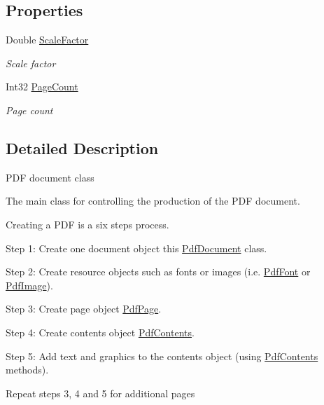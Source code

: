 \subsection*{Properties}
\begin{DoxyCompactItemize}
\item 
Double \hyperlink{class_pdf_file_writer_1_1_pdf_document_a978123b82efb2713ddfb4a44e4f428cc}{Scale\+Factor}
\begin{DoxyCompactList}\small\item\em Scale factor \end{DoxyCompactList}\item 
Int32 \hyperlink{class_pdf_file_writer_1_1_pdf_document_ac1aafc4b240f378a37d93f6645331dc4}{Page\+Count}
\begin{DoxyCompactList}\small\item\em Page count \end{DoxyCompactList}\end{DoxyCompactItemize}


\subsection{Detailed Description}
P\+DF document class 

The main class for controlling the production of the P\+DF document. 

Creating a P\+DF is a six steps process. 

Step 1\+: Create one document object this \hyperlink{class_pdf_file_writer_1_1_pdf_document}{Pdf\+Document} class. 

Step 2\+: Create resource objects such as fonts or images (i.\+e. \hyperlink{class_pdf_file_writer_1_1_pdf_font}{Pdf\+Font} or \hyperlink{class_pdf_file_writer_1_1_pdf_image}{Pdf\+Image}). 

Step 3\+: Create page object \hyperlink{class_pdf_file_writer_1_1_pdf_page}{Pdf\+Page}. 

Step 4\+: Create contents object \hyperlink{class_pdf_file_writer_1_1_pdf_contents}{Pdf\+Contents}. 

Step 5\+: Add text and graphics to the contents object (using \hyperlink{class_pdf_file_writer_1_1_pdf_contents}{Pdf\+Contents} methods). 

Repeat steps 3, 4 and 5 for additional pages 

